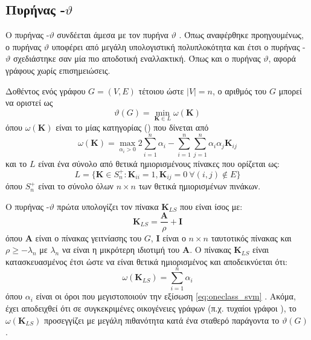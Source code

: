 \subsection{Πυρήνας -$\vartheta$}
\label{ssec:svm_k}
Ο πυρήνας -$\vartheta$ συνδέεται άμεσα με τον πυρήνα  $\vartheta$ \cite{johansson2014global}.
Όπως αναφέρθηκε προηγουμένως, ο πυρήνας  $\vartheta$ υποφέρει από μεγάλη υπολογιστική πολυπλοκότητα και έτσι ο πυρήνας -$\vartheta$ σχεδιάστηκε σαν μία πιο αποδοτική εναλλακτική. 
Όπως και ο πυρήνας  $\vartheta$, αφορά γράφους χωρίς επισημειώσεις.

Δοθέντος ενός γράφου $G=(V,E)$ τέτοιου ώστε $|V| = n$, ο αριθμός  του $G$ μπορεί να οριστεί ως
\begin{equation}
    \vartheta(G) = \min_{\mathbf{K} \in L} \omega(\mathbf{K})
\end{equation}
όπου $\omega(\mathbf{K})$ είναι το  μίας κατηγορίας () που δίνεται από
\begin{equation}
    \label{eq:oneclass_svm}
    \omega(\mathbf{K}) = \max_{\alpha_i > 0} 2\sum_{i=1}^{n} \alpha_i - \sum_{i=1}^{n} \sum_{j=1}^{n} \alpha_i \alpha_j \mathbf{K}_{ij}
\end{equation}
και το $L$ είναι ένα σύνολο από θετικά ημιορισμένους πίνακες που ορίζεται ως:
\begin{equation}
    L = \{ \mathbf{K} \in S_{n}^+ : \mathbf{K}_{ii} = 1, \mathbf{K}_{ij}=0 \: \forall (i,j) \not \in E \}
\end{equation}
όπου $S_{n}^+$ είναι το σύνολο όλων $n \times n$ των θετικά ημιορισμένων πινάκων.

Ο πυρήνας -$\vartheta$ πρώτα υπολογίζει τον πίνακα $\mathbf{K}_{LS}$ που είναι ίσος με:
\begin{equation}
    \mathbf{K}_{LS} = \frac{\mathbf{A}}{\rho} + \mathbf{I}
\end{equation}
όπου $\mathbf{A}$ είναι ο πίνακας γειτνίασης του $G$, $\mathbf{I}$ είναι ο $n \times n$ ταυτοτικός πίνακας και $\rho \geq -\lambda_n$ με $\lambda_n$ να είναι η μικρότερη ιδιοτιμή του $\mathbf{A}$.
Ο πίνακας $\mathbf{K}_{LS}$ είναι κατασκευασμένος έτσι ώστε να είναι θετικά ημιορισμένος και αποδεικνύεται ότι: 
\begin{equation}
    \omega(\mathbf{K}_{LS}) = \sum_{i=1}^n \alpha_i
\end{equation}
όπου $\alpha_i$ είναι οι όροι που μεγιστοποιούν την εξίσωση \ref{eq:oneclass_svm} \cite{jethava2013lovasz}.
Ακόμα, έχει αποδειχθεί ότι σε συγκεκριμένες οικογένειες γράφων (π.χ. τυχαίοι γράφοι ), το  $\omega(\mathbf{K}_{LS})$ προσεγγίζει με μεγάλη πιθανότητα κατά ένα σταθερό παράγοντα το $\vartheta(G)$.

